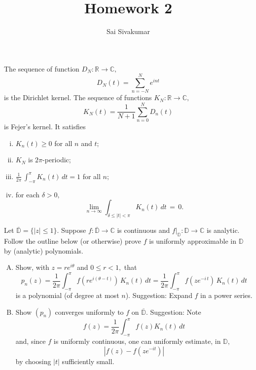 \documentclass[12pt]{amsart}
\title{Homework 2}
\author{Sai Sivakumar}
\newcommand{\RR}{\mathbb{R}}
\newcommand{\CC}{\mathbb{C}}
\newcommand{\DD}{\mathbb{D}}
\begin{document}
\maketitle

\thispagestyle{empty}
The sequence of function $D_N:\RR\to \CC,$  
\[
 D_N(t) = \sum_{n=-N}^N e^{int}
\]
 is the Dirichlet kernel. The sequence of functions $K_N:\RR\to \CC,$ 
\[
 K_N(t) =   \frac{1}{N+1}\sum_{n=0}^N D_n(t) 
\]
 is Fejer's kernel. It satisfies
\begin{enumerate}[(i)]
 \item $K_n(t)\ge 0$ for all $n$ and $t;$
 \item $K_N$ is $2\pi$-periodic;
 \item  $\frac{1}{2\pi}\, \int_{-\pi}^{\pi} K_n(t)\, dt = 1$ for all $n;$ 
 \item  for each $\delta>0,$
\[
  \lim_{n\to\infty} \int_{\delta \le |t|<\pi} K_n(t)\, dt \, = \, 0.
\]
\end{enumerate}
\bigskip

Let $\overline{\DD}=\{|z| \le 1\}.$ Suppose $f:\overline{\DD}\to \CC$ is continuous and $f|_{\DD}:\DD\to\CC$ is analytic. Follow the outline below
(or otherwise) prove $f$ is uniformly approximable in $\DD$  by (analytic)  polynomials.

\begin{enumerate}[(A)]\itemsep=10pt
 \item  Show, with 
 $z=re^{i\theta}$ and $0\le r<1,$ that
\[
 p_n(z) =\frac{1}{2\pi} \int_{-\pi}^\pi f(re^{i(\theta -t)})\, K_n(t)\, dt
  = \frac{1}{2\pi} \int_{-\pi}^\pi f(ze^{-i\, t})\, K_n(t)\, dt
\]
 is a polynomial  (of degree at most $n$). Suggestion: Expand $f$ in a power series.
\item Show $(p_n)$ converges uniformly to $f$ on $\overline{\DD}.$ Suggestion: Note
\[
 f(z) =\frac{1}{2\pi}\int_{-\pi}^\pi f(z) K_n(t)\, dt 
\]
and, since $f$ is uniformly continuous, one can uniformly estimate, in  $\DD,$ 
\[
    |f(z)-f(ze^{-it})|
\]
 by choosing $|t|$ sufficiently small.  
\end{enumerate}

 \bigskip
\end{document}
